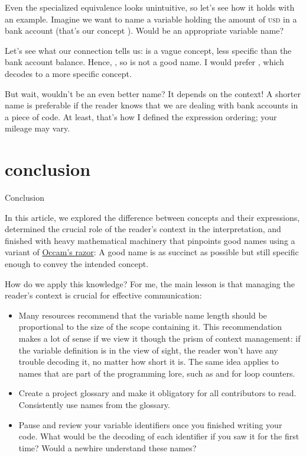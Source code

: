 \documentclass{article}
\begin{document}
Even the specialized equivalence looks unintuitive, so let's see how it holds with an example.
Imagine we want to name a variable holding the amount of \textsc{usd} in a bank account (that's our concept ).
Would  be an appropriate variable name?

Let's see what our connection tells us:  is a vague concept, less specific than the bank account balance.
Hence, , so  is not a good name.
I would prefer , which decodes to a more specific concept.

But wait, wouldn't  be an even better name?
It depends on the context!
A shorter name is preferable if the reader knows that we are dealing with bank accounts in a piece of code.
At least, that's how I defined the expression ordering; your mileage may vary.

\section{conclusion}{Conclusion}

In this article, we explored the difference between concepts and their expressions,
determined the crucial role of the reader's context in the interpretation,
and finished with heavy mathematical machinery that pinpoints good names using a variant of \href{https://en.wikipedia.org/wiki/Occam's_razor}{Occam's razor}:
A good name is as succinct as possible but still specific enough to convey the intended concept.

How do we apply this knowledge?
For me, the main lesson is that managing the reader's context is crucial for effective communication:

\begin{itemize}
\item
  Many resources recommend that the variable name length should be proportional to the size of the scope containing it.
  This recommendation makes a lot of sense if we view it though the prism of context management: if the variable definition is in the view of sight, the reader won't have any trouble decoding it, no matter how short it is.
  The same idea applies to names that are part of the programming lore, such as  and  for loop counters.
\item
  Create a project glossary and make it obligatory for all contributors to read.
  Consistently use names from the glossary.
\item
  Pause and review your variable identifiers once you finished writing your code.
  What would be the decoding of each identifier if you saw it for the first time?
  Would a newhire understand these names?
\end{itemize}
\end{document}
